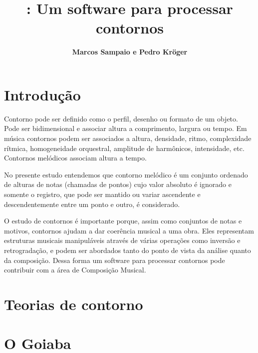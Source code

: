 \documentclass{sciposter}
\title{\goiaba{}: Um software para processar contornos}
\author{\textbf{Marcos Sampaio e Pedro Kröger}}
\institute{Genos---Grupo de pesquisa em computação musical}
\begin{document}



\maketitle

\begin{multicols}{3}

\section{Introdução}

Contorno pode ser definido como o perfil, desenho ou formato de um
objeto. Pode ser bidimensional e associar altura a comprimento,
largura ou tempo. Em música contornos podem ser associados a altura,
densidade, ritmo, complexidade rítmica, homogeneidade orquestral,
amplitude de harmônicos, intensidade, etc. Contornos melódicos
associam altura a tempo.

No presente estudo entendemos que contorno melódico é um conjunto
ordenado de alturas de notas (chamadas de pontos) cujo valor absoluto
é ignorado e somente o registro, que pode ser mantido ou variar
ascendente e descendentemente entre um ponto e outro, é considerado.

O estudo de contornos é importante porque, assim como conjuntos de
notas e motivos, contornos ajudam a dar coerência musical a uma
obra. Eles representam estruturas musicais manipuláveis através de
várias operações como inversão e retrogradação, e podem ser abordados
tanto do ponto de vista da análise quanto da composição. Dessa forma
um software para processar contornos pode contribuir com a área de
Composição Musical.

\section{Teorias de contorno}

\section{O Goiaba}

\end{multicols}
\end{document}
